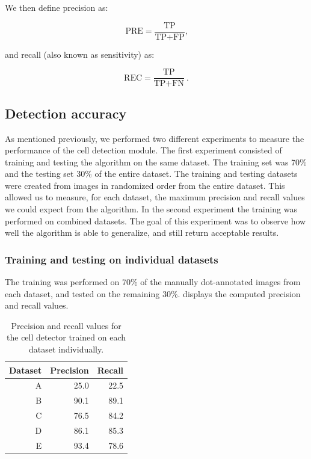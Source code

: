 	We then define precision as:
	
	\[
		\text{PRE} = \frac{\text{TP}}{\text{TP}+\text{FP}}\text{,}
	\]
	
	\noindent and recall (also known as sensitivity) as:
	
	\[
		\text{REC} = \frac{\text{TP}}{\text{TP} + \text{FN}}\ \text{.}
	\]
	
	\subsection{Detection accuracy}
			
		As mentioned previously, we performed two different experiments to measure the performance of the cell detection module. The first experiment consisted of training and testing the algorithm on the same dataset. The training set was 70\% and the testing set 30\% of the entire dataset. The training and testing datasets were created from images in randomized order from the entire dataset. This allowed us to measure, for each dataset, the maximum precision and recall values we could expect from the algorithm. In the second experiment the training was performed on combined datasets. The goal of this experiment was to observe how well the algorithm is able to generalize, and still return acceptable results.
		
		\subsubsection{Training and testing on individual datasets}
		
		The training was performed on 70\% of the manually dot-annotated images from each dataset, and tested on the remaining 30\%.  displays the computed precision and recall values.
		
		
		\begin{table}[h]
			\centering
			\begin{tabular}{rrr}
				Dataset & Precision & Recall \\
				\hline
				      A &      25.0 &   22.5 \\
				      B &      90.1 &   89.1 \\
				      C &      76.5 &   84.2 \\
				      D &      86.1 &   85.3 \\
				      E &      93.4 &   78.6
			\end{tabular} 
			\caption{Precision and recall values for the cell detector trained on each dataset individually.}
			\label{tab:results_detector_individual}
		\end{table}
		
